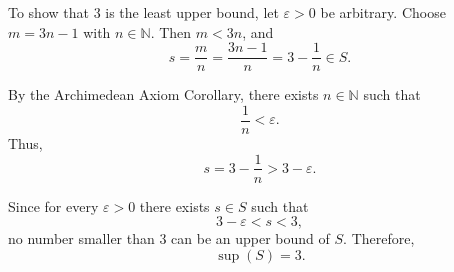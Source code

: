 \documentclass[12pt]{article}
\begin{document}
\begin{itemize}
\medskip

To show that $3$ is the least upper bound, let $\varepsilon > 0$ be arbitrary.
Choose $m = 3n - 1$ with $n \in \mathbb{N}$. Then $m < 3n$, and
\[
s = \frac{m}{n} = \frac{3n - 1}{n} = 3 - \frac{1}{n} \in S.
\]

By the Archimedean Axiom Corollary, there exists $n \in \mathbb{N}$ such that
\[
\frac{1}{n} < \varepsilon.
\]
Thus,
\[
s = 3 - \frac{1}{n} > 3 - \varepsilon.
\]

\medskip

Since for every $\varepsilon > 0$ there exists $s \in S$ such that
\[
3 - \varepsilon < s < 3,
\]
no number smaller than $3$ can be an upper bound of $S$. Therefore,
\[
\sup(S) = 3.
\]

\end{itemize}
\end{document}
